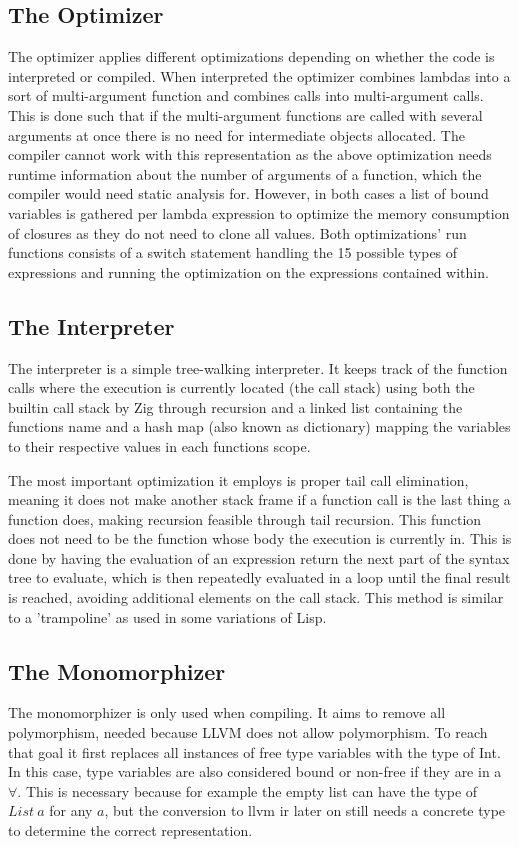 \documentclass[12pt]{article}
\newcommand{\importListing}[1]{
    \begin{minipage}{\textwidth}
    
    \end{minipage}
}
\begin{document}
\subsection{The Optimizer}
\importListing{code/optimizer.tex}
The optimizer applies different optimizations depending on whether
the code is interpreted or compiled. When interpreted
the optimizer combines lambdas into a sort of multi-argument function
and combines calls into multi-argument calls.
This is done such that if the multi-argument functions are called with several arguments
at once there is no need for intermediate objects allocated.
The compiler cannot work with this representation as the above optimization needs runtime information
about the number of arguments of a function, which the compiler would need static analysis for.
However, in both cases a list of bound variables is gathered per lambda expression
to optimize the memory consumption of closures as they do not need to clone all values.
Both optimizations' run functions consists of a switch statement handling
the 15 possible types of expressions and running the optimization on the expressions contained
within.

\subsection{The Interpreter}
The interpreter is a simple tree-walking interpreter.
It keeps track of the function calls where the execution is currently located
(the call stack) using both the builtin call stack by Zig through recursion
and a linked list containing the functions name and a hash map (also known as dictionary) mapping the variables to their
respective values in each functions scope.

The most important optimization it employs is proper tail call elimination,
meaning it does not make another stack frame if a function call is the last
thing a function does, making recursion feasible through
tail recursion. This function does not need to be the function whose body the
execution is currently in. This is done by having the evaluation of an expression return
the next part of the syntax tree to evaluate, which is then repeatedly evaluated in a loop until the final result
is reached, avoiding additional elements on the call stack. This method is similar to
a 'trampoline' as used in some variations of Lisp.

\subsection{The Monomorphizer}
The monomorphizer is only used when compiling.
It aims to remove all polymorphism,
needed because LLVM does not allow polymorphism.
To reach that goal it first replaces all instances of free type variables
with the type of Int. In this case, type variables are also considered
bound or non-free if they are in a $\forall$. This is necessary because for example the empty list
can have the type of $List\:a$ for any $a$, but the conversion to \Gls{llvm} \Gls{ir} later on still needs a concrete
type to determine the correct representation.
\end{document}
